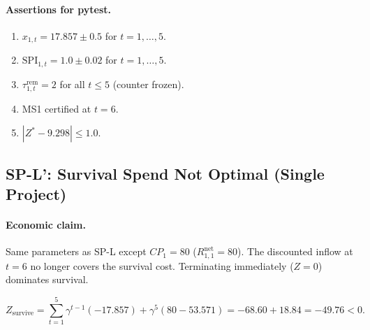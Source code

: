 \paragraph{Assertions for pytest.}
\begin{enumerate}[label=A\arabic*.]
  \item $x_{1,t}=17.857\pm0.5$ for $t=1,\ldots,5$.
  \item $\mathrm{SPI}_{1,t}=1.0\pm0.02$ for $t=1,\ldots,5$.
  \item $\tau_{1,t}^{\mathrm{rem}}=2$ for all $t\leq5$ (counter frozen).
  \item MS1 certified at $t=6$.
  \item $|Z^*-9.298|\leq1.0$.
\end{enumerate}

\subsection{SP-L': Survival Spend Not Optimal (Single Project)}

\paragraph{Economic claim.}
Same parameters as SP-L except $CP_1=80$ ($R_{1,1}^{\mathrm{net}}=80$).
The discounted inflow at $t=6$ no longer covers the survival cost.
Terminating immediately ($Z=0$) dominates survival.

\[
  Z_{\mathrm{survive}} = \sum_{t=1}^{5}\gamma^{t-1}(-17.857)
    +\gamma^5(80-53.571)
    = -68.60+18.84 = -49.76 < 0.
\]

